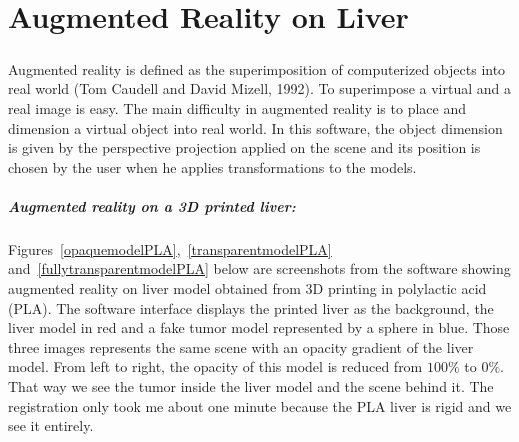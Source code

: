 \documentclass[12pt]{report}
\begin{document}
\chapter{Augmented Reality on Liver} \label{sec:method} 

\paragraph{}
	Augmented reality is defined as the superimposition of computerized objects into real world (Tom Caudell and David Mizell, 1992). To superimpose a virtual and a real image is easy. The main difficulty in augmented reality is to place and dimension a virtual object into real world. In this software, the object dimension is given by the perspective projection applied on the scene and its position is chosen by the user when he applies transformations to the models.

\paragraph{Augmented reality on a 3D printed liver:}
	Figures~\ref{opaquemodelPLA},~\ref{transparentmodelPLA} and~\ref{fullytransparentmodelPLA} below are screenshots from the software showing augmented reality on liver model obtained from 3D printing in polylactic acid (PLA). The software interface displays the printed liver as the background, the liver model in red and a fake tumor model represented by a sphere in blue. Those three images represents the same scene with an opacity gradient of the liver model. From left to right, the opacity of this model is reduced from $100\%$ to $0\%$. That way we see the tumor inside the liver model and the scene behind it. The registration only took me about one minute because the PLA liver is rigid and we see it entirely.
\end{document}
